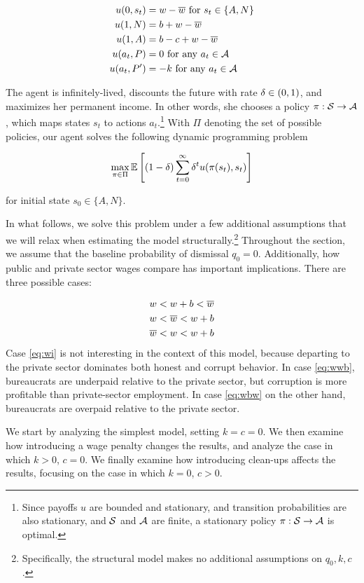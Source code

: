 {\begin{align*}
    u(0, s_t) &= w - \overline{w} \text{ for } s_t \in \{A,N\} \\
    u(1, N) &= b + w - \overline{w} \\
    u(1, A) &= b - c + w - \overline{w} \\ 
    u(a_t, P) &= 0 \text{ for any } a_t \in \mathcal{A} \\
    u(a_t, P') &= - k \text{ for any } a_t \in \mathcal{A}
\end{align*}

The agent is infinitely-lived, discounts the future with rate $\delta \in (0,1)$, and maximizes her permanent income. In other words, she chooses a policy $\pi : \mathcal{S} \rightarrow \mathcal{A}$, which maps states $s_t$ to actions $a_t$.\footnote{Since payoffs $u$ are bounded and stationary, and transition probabilities are also stationary, and $\mathcal{S}$ and $\mathcal{A}$ are finite, a stationary policy $\pi : \mathcal{S} \rightarrow \mathcal{A}$ is optimal.} With $\Pi$ denoting the set of possible policies, our agent solves the following dynamic programming problem 

$$
\max_{\pi \in \Pi} \mathbb{E} \left[ (1-\delta) \sum_{t = 0}^\infty \delta^t u(\pi(s_t), s_t) \right] 
$$

for initial state $s_0 \in \{A,N\}$. 

In what follows, we solve this problem under a few additional assumptions that we will relax when estimating the model structurally.\footnote{Specifically, the structural model makes no additional assumptions on $q_0, k, c$.} Throughout the section, we assume that the baseline probability of dismissal $q_0 = 0$. Additionally, how public and private sector wages compare has important implications. There are three possible cases:

\begin{align}
    w < w+b < \overline{w} \label{eq:wi} \\ 
    w < \overline{w} < w+b \label{eq:wwb} \\
    \overline{w} < w < w+b \label{eq:wbw}
\end{align}
Case \ref{eq:wi} is not interesting in the context of this model, because departing to the private sector dominates both honest and corrupt behavior. In case \ref{eq:wwb}, bureaucrats are underpaid relative to the private sector, but corruption is more profitable than private-sector employment. In case \ref{eq:wbw} on the other hand, bureaucrats are overpaid relative to the private sector. 

We start by analyzing the simplest model, setting $k = c = 0$. We then examine how introducing a wage penalty changes the results, and analyze the case in which $k > 0$, $c = 0$. We finally examine how introducing clean-ups affects the results, focusing on the case in which $k = 0$, $c > 0$. 

}
